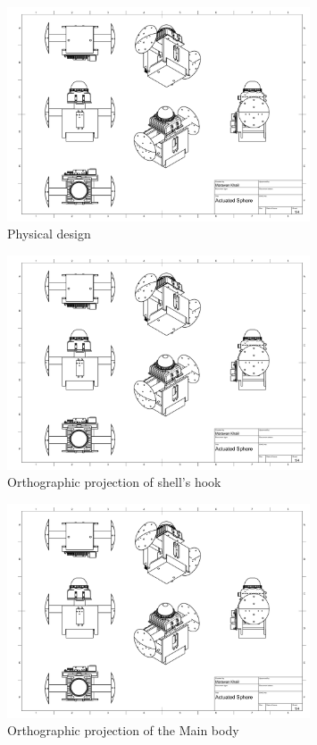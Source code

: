 \documentclass[english, bachelor, utf8]{base/thesis_telematics}
\begin{document}
\begin{figure}
\centering
\includegraphics[width=0.80\textwidth,page=1]{pics/Actuated_Sphere_Drawing.pdf}
\caption{Physical design}
\label{fig:act_system_page1}
\end{figure}

\begin{figure}[H]
\centering
\includegraphics[width=0.80\textwidth,page=2]{pics/Actuated_Sphere_Drawing.pdf}
\caption{Orthographic projection of shell's hook}
\label{fig:act_system_page2}
\end{figure}

\begin{figure}[H]
\centering
\includegraphics[width=0.80\textwidth,page=3]{pics/Actuated_Sphere_Drawing.pdf}
\caption{Orthographic projection of the Main body}
\label{fig:act_system_page3}
\end{figure}
\end{document}
